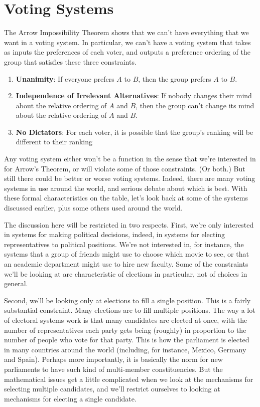 \documentclass[11pt,]{article}
\providecommand{\tightlist}{%
  \setlength{\itemsep}{0pt}\setlength{\parskip}{0pt}}
\begin{document}
\hypertarget{voting-systems}{%
\section{Voting Systems}\label{voting-systems}}

The Arrow Impossibility Theorem shows that we can't have everything that
we want in a voting system. In particular, we can't have a voting system
that takes as inputs the preferences of each voter, and outputs a
preference ordering of the group that satisfies these three constraints.

\begin{enumerate}
\def\labelenumi{\arabic{enumi}.}
\tightlist
\item
  \textbf{Unanimity}: If everyone prefers \(A\) to \(B\), then the group
  prefers \(A\) to \(B\).
\item
  \textbf{Independence of Irrelevant Alternatives}: If nobody changes
  their mind about the relative ordering of \(A\) and \(B\), then the
  group can't change its mind about the relative ordering of \(A\) and
  \(B\).
\item
  \textbf{No Dictators}: For each voter, it is possible that the group's
  ranking will be different to their ranking
\end{enumerate}

Any voting system either won't be a function in the sense that we're
interested in for Arrow's Theorem, or will violate some of those
constraints. (Or both.) But still there could be better or worse voting
systems. Indeed, there are many voting systems in use around the world,
and serious debate about which is best. With these formal
characteristics on the table, let's look back at some of the systems
discussed earlier, plus some others used around the world.

The discussion here will be restricted in two respects. First, we're
only interested in systems for making political decisions, indeed, in
systems for electing representatives to political positions. We're not
interested in, for instance, the systems that a group of friends might
use to choose which movie to see, or that an academic department might
use to hire new faculty. Some of the constraints we'll be looking at are
characteristic of elections in particular, not of choices in general.

Second, we'll be looking only at elections to fill a single position.
This is a fairly substantial constraint. Many elections are to fill
multiple positions. The way a lot of electoral systems work is that many
candidates are elected at once, with the number of representatives each
party gets being (roughly) in proportion to the number of people who
vote for that party. This is how the parliament is elected in many
countries around the world (including, for instance, Mexico, Germany and
Spain). Perhaps more importantly, it is basically the norm for new
parliaments to have such kind of multi-member constituencies. But the
mathematical issues get a little complicated when we look at the
mechanisms for selecting multiple candidates, and we'll restrict
ourselves to looking at mechanisms for electing a single candidate.
\end{document}
